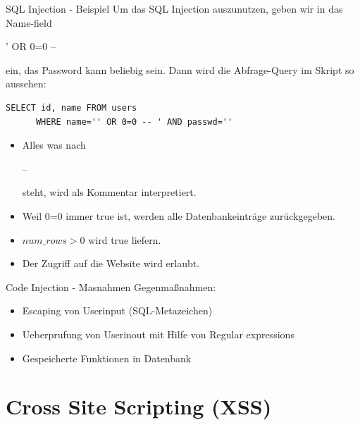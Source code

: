 \documentclass[10pt]{beamer}
\begin{document}
\begin{frame}[fragile]{SQL Injection - Beispiel}
  Um das SQL Injection auszunutzen, geben wir in das Name-field {\fboxsep=0pt\colorbox{mGreen!50}{\strut ' OR 0=0 -- }} ein, das Password kann beliebig sein.
  \newline
  Dann wird die Abfrage-Query im Skript so aussehen:
  \newline
  \begin{lstlisting}[style=SQLStyle]
    SELECT id, name FROM users
      WHERE name='' OR 0=0 -- ' AND passwd=''
  \end{lstlisting}
  \begin{itemize}
    \item Alles was nach {\fboxsep=0pt\colorbox{mGreen!50}{\strut -- }} steht, wird als Kommentar interpretiert.
    \item Weil 0=0 immer true ist, werden alle Datenbankeintr\"age zur\"uckgegeben.
    \item $num\_rows>0$ wird true liefern.
    \item Der Zugriff auf die Website wird erlaubt.
  \end{itemize}

\end{frame}

\begin{frame}[fragile]{Code Injection - Masnahmen}
  Gegenmaßnahmen:
  \begin{itemize}
    \item Escaping von Userinput (SQL-Metazeichen)
    \item Ueberprufung von Userinout mit Hilfe von Regular expressions
    \item Gespeicherte Funktionen in Datenbank
  \end{itemize}
\end{frame}


\section{Cross Site Scripting (XSS)}
\end{document}
